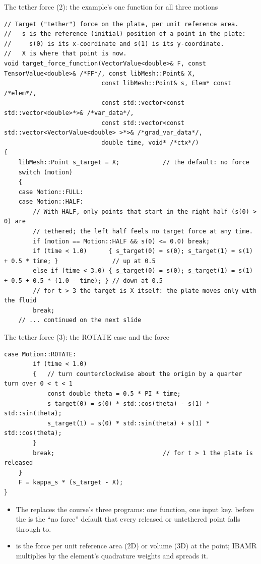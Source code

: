 \documentclass[aspectratio=169,11pt]{beamer}
\begin{document}
\begin{frame}[fragile]{The tether force (2): the example's one function for all three motions}
\label{fr:tethercode}
\begin{lstlisting}[style=cpptiny]
// Target ("tether") force on the plate, per unit reference area.
//   s is the reference (initial) position of a point in the plate:
//     s(0) is its x-coordinate and s(1) is its y-coordinate.
//   X is where that point is now.
void target_force_function(VectorValue<double>& F, const TensorValue<double>& /*FF*/, const libMesh::Point& X,
                           const libMesh::Point& s, Elem* const /*elem*/,
                           const std::vector<const std::vector<double>*>& /*var_data*/,
                           const std::vector<const std::vector<VectorValue<double> >*>& /*grad_var_data*/,
                           double time, void* /*ctx*/)
{
    libMesh::Point s_target = X;            // the default: no force
    switch (motion)
    {
    case Motion::FULL:
    case Motion::HALF:
        // With HALF, only points that start in the right half (s(0) > 0) are
        // tethered; the left half feels no target force at any time.
        if (motion == Motion::HALF && s(0) <= 0.0) break;
        if (time < 1.0)      { s_target(0) = s(0); s_target(1) = s(1) + 0.5 * time; }               // up at 0.5
        else if (time < 3.0) { s_target(0) = s(0); s_target(1) = s(1) + 0.5 + 0.5 * (1.0 - time); } // down at 0.5
        // for t > 3 the target is X itself: the plate moves only with the fluid
        break;
    // ... continued on the next slide
\end{lstlisting}
\end{frame}

\begin{frame}[fragile]{The tether force (3): the ROTATE case and the force}
\label{fr:tethercode2}
\begin{lstlisting}[style=cpptiny]
    case Motion::ROTATE:
        if (time < 1.0)
        {   // turn counterclockwise about the origin by a quarter turn over 0 < t < 1
            const double theta = 0.5 * PI * time;
            s_target(0) = s(0) * std::cos(theta) - s(1) * std::sin(theta);
            s_target(1) = s(0) * std::sin(theta) + s(1) * std::cos(theta);
        }
        break;                              // for t > 1 the plate is released
    }
    F = kappa_s * (s_target - X);
}
\end{lstlisting}
\footnotesize
\begin{itemize}
  \item The  replaces the course's three programs: one function, one input key.  before the  is the ``no force'' default that every released or untethered point falls through to.
  \item {} is the force per unit reference area (2D) or volume (3D) at the point; IBAMR multiplies by the element's quadrature weights and spreads it.
\end{itemize}
\end{frame}
\end{document}

